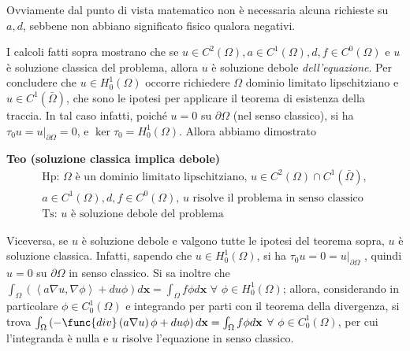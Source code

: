 \documentclass{article}
\begin{document}
Ovviamente dal punto di vista matematico non \`{e} necessaria alcuna
richieste su $a,d$, sebbene non abbiano significato fisico qualora negativi.

I calcoli fatti sopra mostrano che se $u\in C^{2}\left( \Omega \right) ,a\in
C^{1}\left( \Omega \right) ,d,f\in C^{0}\left( \Omega \right) $ e $u$ \`{e}
soluzione classica del problema, allora $u$ \`{e} soluzione debole \textit{%
dell'equazione}. Per concludere che $u\in H_{0}^{1}\left( \Omega \right) $
occorre richiedere $\Omega $ dominio limitato lipschitziano e $u\in
C^{1}\left( \bar{\Omega}\right) $, che sono le ipotesi per applicare il
teorema di esistenza della traccia. In tal caso infatti, poich\'{e} $u=0$ su 
$\partial \Omega $ (nel senso classico), si ha $\tau _{0}u=u|_{\partial
\Omega }=0$, e $\ker \tau _{0}=H_{0}^{1}\left( \Omega \right) $. Allora
abbiamo dimostrato

\textbf{Teo (soluzione classica implica debole)}%
\begin{gather*}
\text{Hp}\text{: }\Omega \text{ \`{e} un dominio limitato lipschitziano, }%
u\in C^{2}\left( \Omega \right) \cap C^{1}\left( \bar{\Omega}\right) , \\
a\in C^{1}\left( \Omega \right) ,d,f\in C^{0}\left( \Omega \right) \text{, }u%
\text{ risolve il problema in senso classico} \\
\text{Ts}\text{: }u\text{ \`{e} soluzione debole del problema}
\end{gather*}

Viceversa, se $u$ \`{e} soluzione debole e valgono tutte le ipotesi del
teorema sopra, $u$ \`{e} soluzione classica. Infatti, sapendo che $u\in
H_{0}^{1}\left( \Omega \right) $, si ha $\tau _{0}u=0=u|_{\partial \Omega }$%
, quindi $u=0$ su $\partial \Omega $ in senso classico. Si sa inoltre che $%
\int_{\Omega }\left( \left\langle a\nabla u,\nabla \phi \right\rangle
+du\phi \right) d\mathbf{x}=\int_{\Omega }f\phi d\mathbf{x}$ $\forall $ $%
\phi \in H_{0}^{1}\left( \Omega \right) $; allora, considerando in
particolare $\phi \in C_{0}^{1}\left( \Omega \right) $ e integrando per
parti con il teorema della divergenza, si trova $\int_{\Omega }\left( -\func{%
div}\left( a\nabla u\right) \phi +du\phi \right) d\mathbf{x}=\int_{\Omega
}f\phi d\mathbf{x}$ $\forall $ $\phi \in C_{0}^{1}\left( \Omega \right) $,
per cui l'integranda \`{e} nulla e $u$ risolve l'equazione in senso classico.
\end{document}
